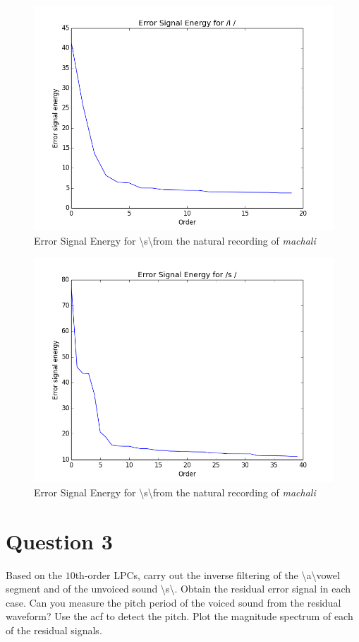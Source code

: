 \documentclass[a4paper]{article}
\begin{document}
\begin{figure}[h!]
    \includegraphics[width=\linewidth]{./images/error_energy_i.png}
    \caption{Error Signal Energy for \textbackslash s\textbackslash from the natural recording of \textit{machali}}
    \label{fig:1}
\end{figure}


\begin{figure}[h!]
    \includegraphics[width=\linewidth]{./images/error_energy_s.png}
    \caption{ Error Signal Energy for \textbackslash s\textbackslash from the natural recording of \textit{machali}}
    \label{fig:1}
\end{figure}


\newpage
\section{Question 3}
Based on the $10$th-order LPCs, carry out the inverse filtering of the  \textbackslash a\textbackslash vowel segment and of the unvoiced sound  \textbackslash s\textbackslash. Obtain the residual error signal in each case. Can you measure the pitch period of the voiced sound from the residual waveform? Use the acf to detect the pitch. Plot the magnitude spectrum of each of the residual signals. 
\end{document}
